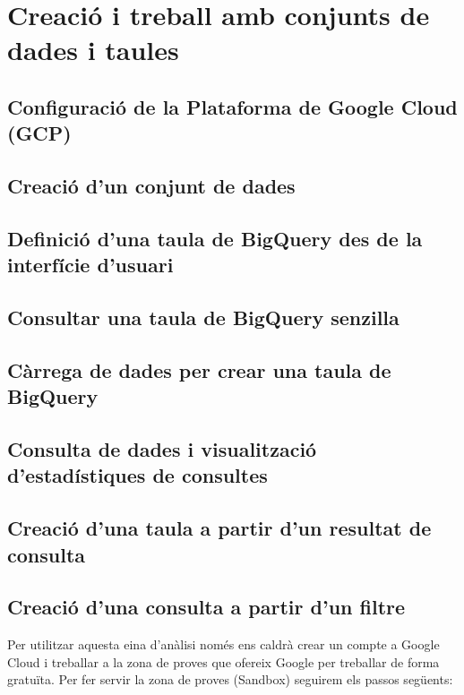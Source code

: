 \documentclass[12pt,longbibliography]{article}
\theoremstyle{definition}
\theoremstyle{remark}
\begin{document}
\pagebreak

\section{Creació i treball amb conjunts de dades i taules}

\subsection{Configuració de la Plataforma de Google Cloud (GCP)}

\subsection{Creació d'un conjunt de dades}

\subsection{Definició d'una taula de BigQuery des de la interfície d'usuari}

\subsection{Consultar una taula de BigQuery senzilla}

\subsection{Càrrega de dades per crear una taula de BigQuery}

\subsection{Consulta de dades i visualització d'estadístiques de consultes}

\subsection{Creació d'una taula a partir d'un resultat de consulta}

\subsection{Creació d'una consulta a partir d'un filtre}

Per utilitzar aquesta eina d’anàlisi només ens caldrà crear un compte a Google Cloud i treballar a la zona de proves que ofereix Google per treballar de forma gratuïta.
Per fer servir la zona de proves (Sandbox) seguirem els passos següents: 
\end{document}
